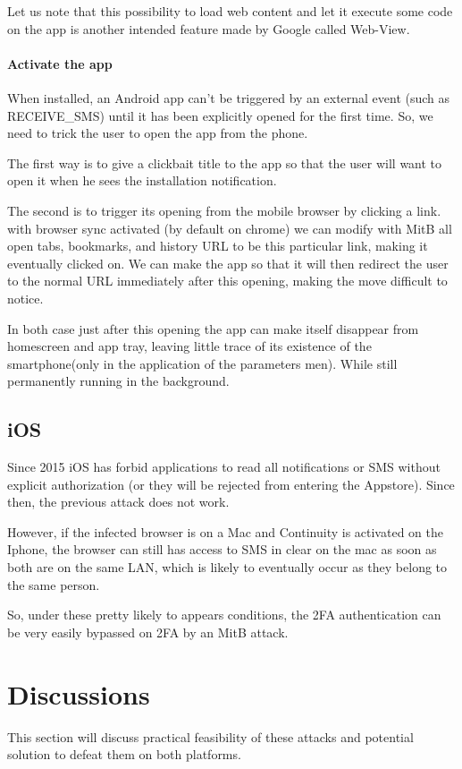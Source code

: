 \documentclass[11pt, a4paper,twocolumn]{article}
\begin{document}
Let us note that this possibility to load web content and let it execute some code on the app is another intended feature made by Google called Web-View.

\paragraph{Activate the app} When installed, an Android app can't be triggered by an external event (such as RECEIVE\_SMS) until it has been explicitly opened for the first time. So, we need to trick the user to open the app from the phone. 

The first way is to give a clickbait title to the app so that the user will want to open it when he sees the installation notification.

The second is to trigger its opening from the mobile browser by clicking a link. with browser sync activated (by default on chrome) we can modify with MitB all open tabs, bookmarks, and history URL to be this particular link, making it eventually clicked on. We can make the app so that it will then redirect the user to the normal URL immediately after this opening, making the move difficult to notice.

In both case just after this opening the app can make itself disappear from homescreen and app tray, leaving little trace of its existence of the smartphone(only in the application of the parameters men). While still permanently running in the background.

\subsection{iOS}
Since 2015 iOS has forbid applications to read all notifications or SMS without explicit authorization (or they will be rejected from entering the Appstore). 
Since then, the previous attack does not work. 

However, if the infected browser is on a Mac and Continuity is activated on the Iphone, the browser can still has access to SMS in clear on the mac as soon as both are on the same LAN, which is likely to eventually occur as they belong to the same person. 

So, under these pretty likely to appears conditions, the 2FA authentication can be very easily bypassed on 2FA by an MitB attack.


\section{Discussions} 
This section will discuss practical feasibility of these attacks and potential solution to defeat them on both platforms. 
\end{document}
